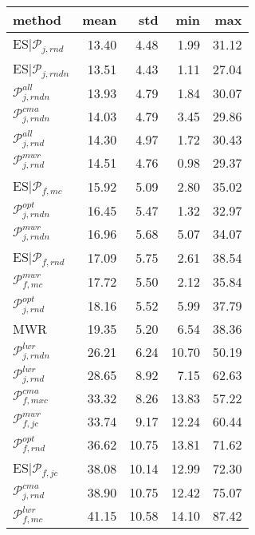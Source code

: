 \begin{tabular}{|@{}l@{}|@{}r@{}|@{}r@{}|@{}r@{}|@{}r@{}|}\hline
method & mean & std & min & max \\ \hline\hline
ES$|{\mathcal{P}_{j,rnd}}$ &  13.40 &  4.48 &  1.99 &  31.12  \\ 
ES\boldmath$|\mathcal{P}_{j,rndn}$ &  13.51 &  4.43 &  1.11 &  27.04  \\ 
\boldmath${\mathcal{P}_{j,rndn}^{all}}$ &  13.93 &  4.79 &  1.84 &  30.07  \\ 
\boldmath${\mathcal{P}_{j,rndn}^{cma}}$ &  14.03 &  4.79 &  3.45 &  29.86  \\ 
${\mathcal{P}_{j,rnd}^{all}}$ &  14.30 &  4.97 &  1.72 &  30.43  \\ 
${\mathcal{P}_{j,rnd}^{mwr}}$ &  14.51 &  4.76 &  0.98 &  29.37  \\ \hline\hline
ES$|{\mathcal{P}_{f,mc}}$ &  15.92 &  5.09 &  2.80 &  35.02  \\ 
\boldmath${\mathcal{P}_{j,rndn}^{opt}}$ &  16.45 &  5.47 &  1.32 &  32.97  \\ 
\boldmath${\mathcal{P}_{j,rndn}^{mwr}}$ &  16.96 &  5.68 &  5.07 &  34.07  \\ 
ES$|{\mathcal{P}_{f,rnd}}$ &  17.09 &  5.75 &  2.61 &  38.54  \\ 
${\mathcal{P}_{f,mc}^{mwr}}$ &  17.72 &  5.50 &  2.12 &  35.84  \\ 
${\mathcal{P}_{j,rnd}^{opt}}$ &  18.16 &  5.52 &  5.99 &  37.79  \\ \hline\hline
MWR &  19.35 &  5.20 &  6.54 &  38.36  \\ \hline\hline
\boldmath${\mathcal{P}_{j,rndn}^{lwr}}$ &  26.21 &  6.24 &  10.70 &  50.19  \\ \hline\hline
${\mathcal{P}_{j,rnd}^{lwr}}$ &  28.65 &  8.92 &  7.15 &  62.63  \\ \hline\hline
${\mathcal{P}_{f,mxc}^{cma}}$ &  33.32 &  8.26 &  13.83 &  57.22  \\ 
${\mathcal{P}_{f,jc}^{mwr}}$ &  33.74 &  9.17 &  12.24 &  60.44  \\ \hline\hline
${\mathcal{P}_{f,rnd}^{opt}}$ &  36.62 &  10.75 &  13.81 &  71.62  \\ \hline\hline
ES$|{\mathcal{P}_{f,jc}}$ &  38.08 &  10.14 &  12.99 &  72.30  \\ 
${\mathcal{P}_{j,rnd}^{cma}}$ &  38.90 &  10.75 &  12.42 &  75.07  \\ \hline\hline
${\mathcal{P}_{f,mc}^{lwr}}$ &  41.15 &  10.58 &  14.10 &  87.42  \\ 

\end{tabular}
